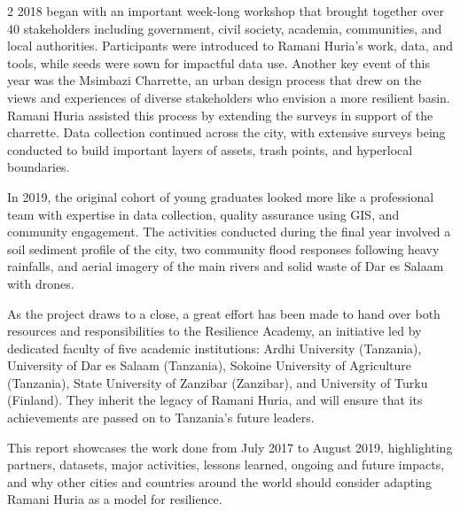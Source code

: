 \documentclass[a4paper,12pt,twoside]{article}
\begin{document}
\begin{multicols} {2}
2018 began with an important week-long workshop that brought together over 40 stakeholders including government, civil society, academia, communities, and local authorities. Participants were introduced to Ramani Huria’s work, data, and tools, while seeds were sown for impactful data use. Another key event of this year was the Msimbazi Charrette, an urban design process that drew on the views and experiences of diverse stakeholders who envision a more resilient basin. Ramani Huria assisted this process by extending the surveys in support of the charrette. Data collection continued across the city, with extensive surveys being conducted to build important layers of assets, trash points, and hyperlocal boundaries. 

In 2019, the original cohort of young graduates looked more like a professional team with expertise in data collection, quality assurance using GIS, and community engagement. The activities conducted during the final year involved a soil sediment profile of the city, two community flood responses following heavy rainfalls, and aerial imagery of the main rivers and solid waste of Dar es Salaam with drones. 

As the project draws to a close, a great effort has been made to hand over both resources and responsibilities to the Resilience Academy, an initiative led by dedicated faculty of five academic institutions: Ardhi University (Tanzania), University of Dar es Salaam (Tanzania), Sokoine University of Agriculture (Tanzania), State University of Zanzibar (Zanzibar), and University of Turku (Finland). They inherit the legacy of Ramani Huria, and will ensure that its achievements are passed on to Tanzania’s future leaders. 

This report showcases the work done from July 2017 to August 2019, highlighting partners, datasets, major activities, lessons learned, ongoing and future impacts, and why other cities and countries around the world should consider adapting Ramani Huria as a model for resilience.

\end{multicols}
\end{document}
